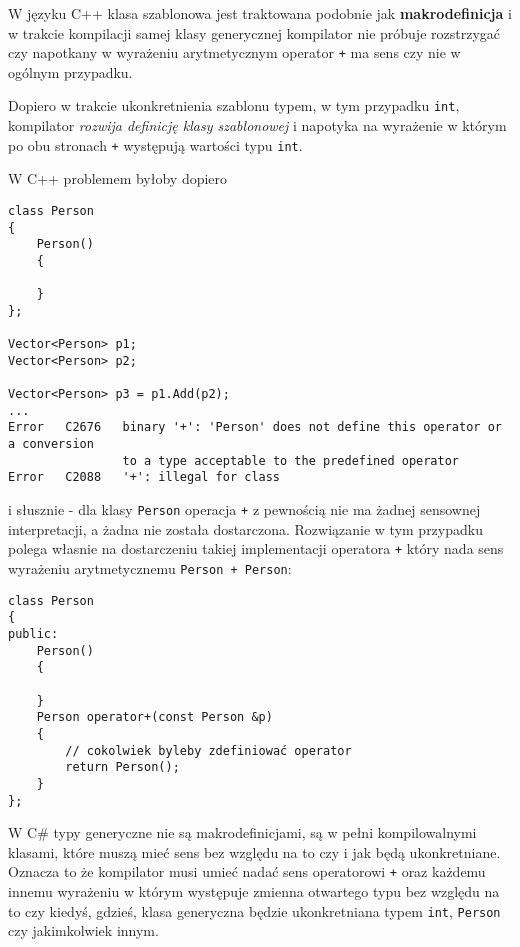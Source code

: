 W języku C++ klasa szablonowa jest traktowana podobnie jak {\bf makrodefinicja} i w trakcie kompilacji samej klasy
generycznej kompilator nie próbuje rozstrzygać czy napotkany w wyrażeniu arytmetycznym operator {\tt +}
ma sens czy nie w ogólnym przypadku.

Dopiero w trakcie ukonkretnienia szablonu typem, w tym przypadku {\tt int}, kompilator {\em rozwija definicję klasy szablonowej}
i napotyka na wyrażenie w którym po obu stronach {\tt +} występują wartości typu {\tt int}.

W C++ problemem byłoby dopiero

\begin{scriptsize}
\begin{verbatim}
class Person
{
    Person()
    {

    }
};

Vector<Person> p1;
Vector<Person> p2;

Vector<Person> p3 = p1.Add(p2);
...
Error	C2676	binary '+': 'Person' does not define this operator or a conversion 
                to a type acceptable to the predefined operator
Error	C2088	'+': illegal for class	
\end{verbatim}
\end{scriptsize}

i słusznie - dla klasy {\tt Person} operacja {\tt +} z pewnością nie ma żadnej sensownej interpretacji, a
żadna nie została dostarczona. Rozwiązanie w tym przypadku polega własnie na dostarczeniu takiej
implementacji operatora {\tt +} który nada sens wyrażeniu arytmetycznemu {\tt Person + Person}:

\begin{scriptsize}
\begin{verbatim}
class Person
{
public:
    Person()
    {

    }
    Person operator+(const Person &p) 
    {
        // cokolwiek byleby zdefiniować operator
        return Person();
    }
};
\end{verbatim}
\end{scriptsize}

W C\# typy generyczne nie są makrodefinicjami, są w pełni kompilowalnymi klasami, które muszą mieć sens 
bez względu na to czy i jak będą ukonkretniane. Oznacza to że kompilator musi umieć nadać sens operatorowi {\tt +}
oraz każdemu innemu wyrażeniu w którym występuje zmienna otwartego typu
bez względu na to czy kiedyś, gdzieś, klasa generyczna będzie ukonkretniana typem {\tt int}, {\tt Person} czy
jakimkolwiek innym.

